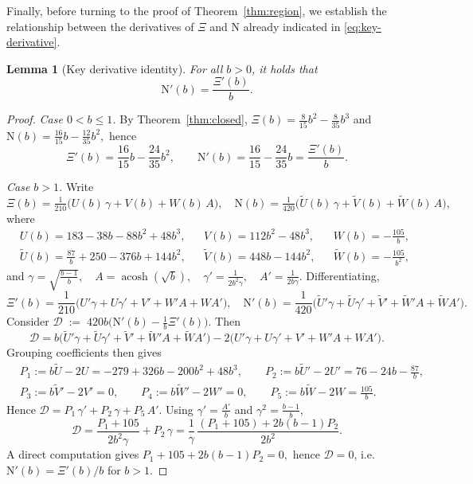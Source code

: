 \documentclass{article}
\newtheorem{lemma}[theorem]{Lemma}
\DeclareMathOperator{\acosh}{acosh}
\newcommand{\1}{\mathds{1}}
\newcommand{\NN}{\mathrm{N}}
\begin{document}
Finally, before turning to the proof of Theorem~\ref{thm:region}, we establish the relationship between the derivatives of $\Xi$ and $\NN$ already indicated in \eqref{eq:key-derivative}. 

\begin{lemma}[Key derivative identity]\label{lem:key-derivative}
For all \(b>0\), it holds that
\[
\NN'(b)=\frac{\Xi'(b)}{b}.
\]
\end{lemma}

\begin{proof}
\emph{Case \(0<b\le 1\).}
By Theorem~\ref{thm:closed},
\(
\Xi(b)=\frac{8}{15}b^2-\frac{8}{35}b^3
\)
and
\(
\NN(b)=\frac{16}{15}b-\frac{12}{35}b^2,
\)
hence
\[
\Xi'(b)=\frac{16}{15}b-\frac{24}{35}b^2,
\qquad
\NN'(b)=\frac{16}{15}-\frac{24}{35}b=\frac{\Xi'(b)}{b}.
\]

\smallskip\noindent
\emph{Case \(b>1\).}
Write
\(
\Xi(b)=\frac{1}{210}\Big(U(b)\,\gamma+V(b)+W(b)\,A\Big),\quad
\NN(b)=\frac{1}{420}\Big(\widetilde U(b)\,\gamma+\widetilde V(b)+\widetilde W(b)\,A\Big),
\)
where
\[
\begin{aligned}
&U(b)=183-38b-88b^2+48b^3, &&V(b)=112b^2-48b^3, &&W(b)=-\frac{105}{b},\\
&\widetilde U(b)=\frac{87}{b}+250-376b+144b^2, &&
\widetilde V(b)=448b-144b^2, &&
\widetilde W(b)=-\frac{105}{b^{2}},
\end{aligned}
\]
and
\(
\gamma=\sqrt{\frac{b-1}{b}},
\quad A=\acosh(\sqrt b),
\quad
\gamma'=\frac{1}{2b^{2}\gamma},
\quad A'=\frac{1}{2b\gamma}.
\)
Differentiating,
\[
\Xi'(b)=\frac{1}{210}\Big(U'\gamma+U\gamma'+V'+W'A+WA'\Big),\quad
\NN'(b)=\frac{1}{420}\Big(\widetilde U'\gamma+\widetilde U\gamma'+\widetilde V'
+\widetilde W'A+\widetilde W A'\Big).
\]
Consider
\(
\mathcal D \;:=\; 420b\Big(\NN'(b)-\tfrac{1}{b}\Xi'(b)\Big).
\)
Then
\[
\mathcal D
= b\big(\widetilde U'\gamma+\widetilde U\gamma'+\widetilde V'
+\widetilde W'A+\widetilde W A'\big)
-2\big(U'\gamma+U\gamma'+V'+W'A+W A'\big).
\]
Grouping coefficients then gives
\[
\begin{aligned}
&P_1:=b\widetilde U-2U=-279+326b-200b^2+48b^3,
\qquad P_2:=b\widetilde U'-2U'=76-24b-\frac{87}{b},\\
&P_3:=b\widetilde V'-2V'=0,\qquad
P_4:=b\widetilde W'-2W'=0,\qquad
P_5:=b\widetilde W-2W=\frac{105}{b}.
\end{aligned}
\]
Hence
\(
\mathcal D
= P_1\,\gamma' + P_2\,\gamma + P_5\,A'.
\)
Using \(\gamma'=\tfrac{A'}{b}\) and \(\gamma^2=\tfrac{b-1}{b}\),
\[
\mathcal D
= \frac{P_1+105}{2b^{2}\gamma} + P_2\,\gamma
= \frac{1}{\gamma}\,\frac{(P_1+105)+2b(b-1)P_2}{2b^{2}}.
\]
A direct computation gives
\(
P_1+105+2b(b-1)P_2=0,
\)
hence \(\mathcal D=0\), i.e.
\(
\NN'(b)=\Xi'(b)/b
\)
for \(b>1\).
\end{proof}
\end{document}

